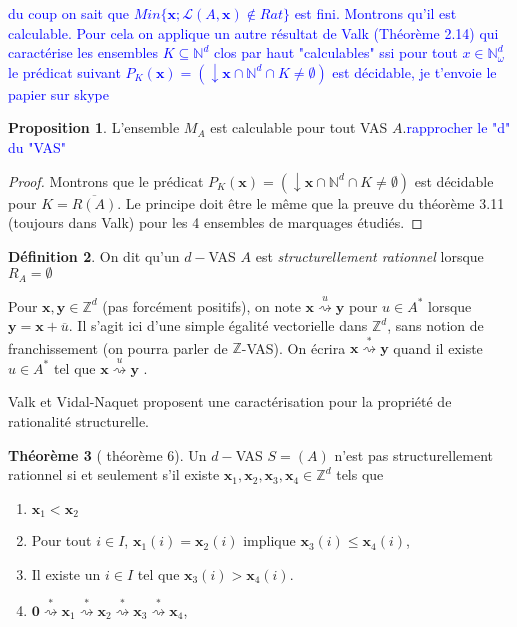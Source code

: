 \documentclass[a4paper,final]{article}
\theoremstyle{definition}
\newtheorem{Theorem}{Théorème}
\newtheorem{Definition}[Theorem]{Définition}
\newtheorem{Proposition}[Theorem]{Proposition}
\let\leq\leqslant
\newcommand{\alain}[1]{\textcolor{blue}{#1}}
\newcommand{\N}{\ensuremath{\mathbb{N}}}
\newcommand{\Z}{\ensuremath{\mathbb{Z}}}
\newcommand{\lang}{\ensuremath{\mathcal{L}}}
\newcommand{\transZ}[1]{\ensuremath{\stackrel{#1}{\rightsquigarrow}}}
\newcommand{\vect}[1]{\ensuremath{\mathbf{#1}}}
\newcommand{\valeur}[1]{\ensuremath{\overline{#1}}}
\begin{document}
\alain{du coup on sait que $Min\{\vect{x}; \lang(A,\vect{x}) \notin Rat\}$ est fini. Montrons qu'il est calculable. Pour cela on applique un autre résultat de Valk (Théorème 2.14) qui caractérise les ensembles $K \subseteq \N^d$ clos par haut "calculables" ssi pour tout $x \in \N_{\omega}^d$ le prédicat suivant $P_K(\vect{x})=(\downarrow \vect{x} \cap \N^d \cap K \neq \emptyset)$ est décidable, je t'envoie le papier sur skype \cite{ValkJ85}}


\begin{Proposition}\label{minimaux}
L'ensemble $M_A$ est calculable pour tout VAS $A$.\alain{rapprocher le "d" du "VAS"}
\end{Proposition}

\begin{proof}
Montrons que le prédicat $P_K(\vect{x})=(\downarrow \vect{x} \cap \N^d \cap K \neq \emptyset)$ est décidable pour $K=\overline{R(A)}$. Le principe doit être le même que la preuve du théorème 3.11 (toujours dans Valk) pour les 4 ensembles de marquages étudiés.
\end{proof}

\begin{Definition}
On dit qu'un $d-$VAS $A$ est \emph{structurellement rationnel} lorsque $R_A=\emptyset$  
\end{Definition}

Pour $\vect{x},\vect{y}\in\Z^d$ (pas forcément positifs), on note $\vect{x} \transZ{u} \vect{y}$ pour $u\in A^*$ lorsque $\vect{y} = \vect{x} + \valeur{u}$.
Il s'agit ici d'une simple égalité vectorielle dans $\Z^d$, sans notion de franchissement (on pourra parler de $\Z$-VAS).
On écrira $\vect{x} \transZ{*} \vect{y}$ quand il existe $u\in A^*$ tel que $\vect{x} \transZ{u} \vect{y}$ .

Valk et Vidal-Naquet proposent une caractérisation pour la propriété de rationalité structurelle.

\begin{Theorem}[\cite{vavi81} théorème 6]
Un $d-$VAS $S=(A)$ n'est pas structurellement rationnel si et seulement s'il existe $\vect{x}_1, \vect{x}_2, \vect{x}_3, \vect{x}_4 \in \Z^d$ tels que 
\begin{enumerate}
    \item $\vect{x}_1 < \vect{x}_2$
    \item Pour tout $i \in I$, $\vect{x}_1(i) = \vect{x}_2(i)$ implique $\vect{x}_3(i) \leq \vect{x}_4(i)$,
    \item Il existe un $i\in I$ tel que $\vect{x}_3(i) > \vect{x}_4(i)$.
    
    \item $\vect{0} \transZ{*} \vect{x}_1 \transZ{*} \vect{x}_2 \transZ{*} \vect{x}_3 \transZ{*} \vect{x}_4$,
\end{enumerate}
\end{Theorem}
\end{document}
